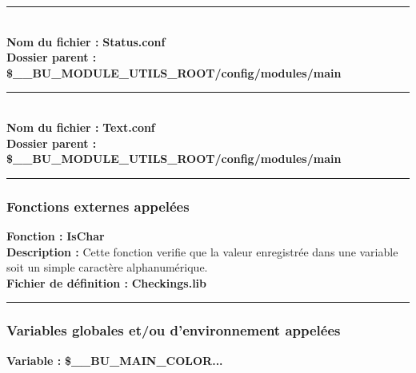 \documentclass[a4paper,10pt]{article}
\begin{document}
\color{lime}\par\noindent\rule{\textwidth}{0.4pt}\color{white}\\[1\baselineskip]

\textbf{Nom du fichier :} \textbf{\color{lime}Status.conf\color{white}}\\[1\baselineskip]
\textbf{Dossier parent :} \textbf{\color{orange}\$\_\_BU\_MODULE\_UTILS\_ROOT\color{lime}/config/modules/main\color{white}}\\[1\baselineskip]



\color{lime}\par\noindent\rule{\textwidth}{0.4pt}\color{white}\\[1\baselineskip]

\textbf{Nom du fichier :} \textbf{\color{lime}Text.conf\color{white}}\\[1\baselineskip]
\textbf{Dossier parent :} \textbf{\color{orange}\$\_\_BU\_MODULE\_UTILS\_ROOT\color{lime}/config/modules/main\color{white}}\\[1\baselineskip]




\color{blue}\par\noindent\rule{\textwidth}{0.4pt}\color{white}

\color{blue}
\subsubsection{Fonctions externes appelées}\color{white}
\textbf{Fonction :} \textbf{\color{mauve}IsChar\color{white}}\\[1\baselineskip]

\textbf{Description :} Cette fonction verifie que la valeur enregistrée dans une variable soit un simple caractère alphanumérique.\\[1\baselineskip]

\textbf{Fichier de définition :} \textbf{\color{lime}Checkings.lib\color{white}}\\[1\baselineskip]



\color{blue}\par\noindent\rule{\textwidth}{0.4pt}\color{white}

\color{blue}
\subsubsection{Variables globales et/ou d'environnement appelées}\color{white}
\textbf{Variable :} \textbf{\color{orange}\$\_\_BU\_MAIN\_COLOR...\color{white}}\\[1\baselineskip]
\end{document}

